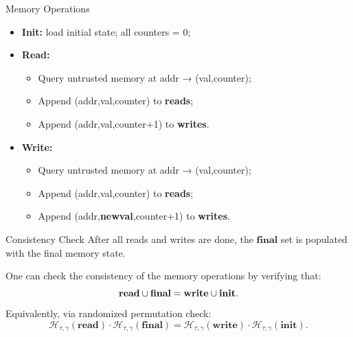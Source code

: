 \documentclass{zkdl-presentation-template}
\begin{document}
    \begin{frame}{Memory Operations}
        \begin{itemize}
            \item \textbf{Init:} load initial state; all counters = 0;  \pause
            \item \textbf{Read:}  
            \begin{itemize}
                \item Query untrusted memory at \textsf{addr} → \textsf{(val,counter)};  
                \item Append \textsf{(addr,val,counter)} to \textbf{reads};
                \item Append \textsf{(addr,val,counter+1)} to \textbf{writes}.
            \end{itemize}\pause
            \item \textbf{Write:} 
            \begin{itemize}
                \item Query untrusted memory at \textsf{addr} → \textsf{(val,counter)};  
                \item Append \textsf{(addr,val,counter)} to \textbf{reads};
                \item Append \textsf{(addr,\textbf{newval},counter+1)} to \textbf{writes}.
            \end{itemize}
        \end{itemize}
    \end{frame}

    \begin{frame}{Consistency Check}
        After all reads and writes are done, the $\mathbf{final}$ set is populated with the final memory state. 

        \begin{lemma}
            One can check the consistency of the memory operations by verifying that:
            \begin{equation*}
                \mathbf{read} \cup \mathbf{final} = \mathbf{write} \cup \mathbf{init}.
                \vspace{-5px}
            \end{equation*}
            Equivalently, via randomized permutation check:
            \vspace{-5px}
            \begin{equation*}
                \mathcal{H}_{\tau,\gamma}(\mathbf{read}) \cdot \mathcal{H}_{\tau,\gamma}(\mathbf{final}) = 
                \mathcal{H}_{\tau,\gamma}(\mathbf{write}) \cdot \mathcal{H}_{\tau,\gamma}(\mathbf{init}).
            \end{equation*}
        \end{lemma}
    \end{frame}
\end{document}

